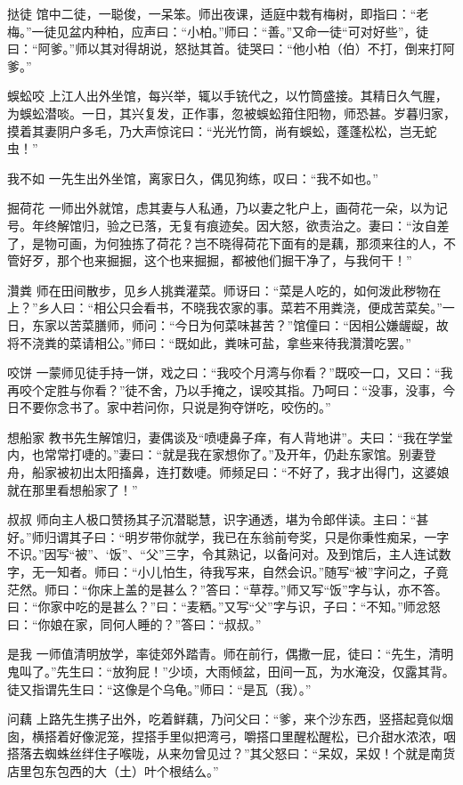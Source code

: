 \documentclass[12pt,UTF8]{ctexbook}
\begin{document}
挞徒
馆中二徒，一聪俊，一呆笨。师出夜课，适庭中栽有梅树，即指曰：“老梅。”一徒见盆内种柏，应声曰：“小柏。”师曰：“善。”又命一徒“可对好些”，徒曰：“阿爹。”师以其对得胡说，怒挞其首。徒哭曰：“他小柏（伯）不打，倒来打阿爹。”

蜈蚣咬
上江人出外坐馆，每兴举，辄以手铳代之，以竹筒盛接。其精日久气腥，为蜈蚣潜啖。一日，其兴复发，正作事，忽被蜈蚣箝住阳物，师恐甚。岁暮归家，摸着其妻阴户多毛，乃大声惊诧曰：“光光竹筒，尚有蜈蚣，蓬蓬松松，岂无蛇虫！”

我不如
一先生出外坐馆，离家日久，偶见狗练，叹曰：“我不如也。”

掘荷花
一师出外就馆，虑其妻与人私通，乃以妻之牝户上，画荷花一朵，以为记号。年终解馆归，验之已落，无复有痕迹矣。因大怒，欲责治之。妻曰：“汝自差了，是物可画，为何独拣了荷花？岂不晓得荷花下面有的是藕，那须来往的人，不管好歹，那个也来掘掘，这个也来掘掘，都被他们掘干净了，与我何干！”

灒粪
师在田间散步，见乡人挑粪灌菜。师讶曰：“菜是人吃的，如何泼此秽物在上？”乡人曰：“相公只会看书，不晓我农家的事。菜若不用粪浇，便成苦菜矣。”一日，东家以苦菜膳师，师问：“今日为何菜味甚苦？”馆僮曰：“因相公嫌龌龊，故将不浇粪的菜请相公。”师曰：“既如此，粪味可盐，拿些来待我灒灒吃罢。”

咬饼
一蒙师见徒手持一饼，戏之曰：“我咬个月湾与你看？”既咬一口，又曰：“我再咬个定胜与你看？”徒不舍，乃以手掩之，误咬其指。乃呵曰：“没事，没事，今日不要你念书了。家中若问你，只说是狗夺饼吃，咬伤的。”

想船家
教书先生解馆归，妻偶谈及“喷啑鼻子痒，有人背地讲”。夫曰：“我在学堂内，也常常打啑的。”妻曰：“就是我在家想你了。”及开年，仍赴东家馆。别妻登舟，船家被初出太阳搐鼻，连打数啑。师频足曰：“不好了，我才出得门，这婆娘就在那里看想船家了！”

叔叔
师向主人极口赞扬其子沉潜聪慧，识字通透，堪为令郎伴读。主曰：“甚好。”师归谓其子曰：“明岁带你就学，我已在东翁前夸奖，只是你秉性痴呆，一字不识。”因写“被”、‘饭”、“父”三字，令其熟记，以备问对。及到馆后，主人连试数字，无一知者。师曰：“小儿怕生，待我写来，自然会识。”随写“被”字问之，子竟茫然。师曰：“你床上盖的是甚么？”答曰：“草荐。”师又写“饭”字与认，亦不答。曰：“你家中吃的是甚么？”曰：“麦粞。”又写“父”字与识，子曰：“不知。”师忿怒曰：“你娘在家，同何人睡的？”答曰：“叔叔。”

是我
一师值清明放学，率徒郊外踏青。师在前行，偶撒一屁，徒曰：“先生，清明鬼叫了。”先生曰：“放狗屁！”少顷，大雨倾盆，田间一瓦，为水淹没，仅露其背。徒又指谓先生曰：“这像是个乌龟。”师曰：“是瓦（我）。”

问藕
上路先生携子出外，吃着鲜藕，乃问父曰：“爹，来个沙东西，竖搭起竟似烟囱，横搭着好像泥笼，捏搭手里似把湾弓，嚼搭口里醒松醒松，已介甜水浓浓，咽搭落去蜘蛛丝绊住子喉咙，从来勿曾见过？”其父怒曰：“呆奴，呆奴！个就是南货店里包东包西的大（土）叶个根结么。”
\end{document}
